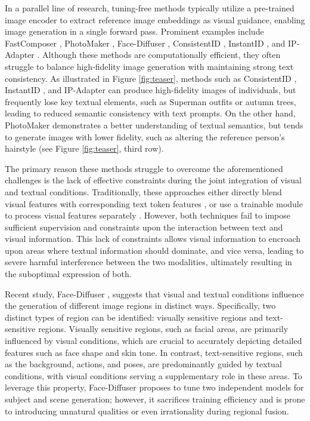 In a parallel line of research, tuning-free methods typically utilize a pre-trained image encoder to extract reference image embeddings as visual guidance, enabling image generation in a single forward pass. Prominent examples include FastComposer \cite{xiao2023fastcomposer}, PhotoMaker \cite{li2024photomaker}, Face-Diffuser \cite{wang2024high}, ConsistentID \cite{huang2024consistentid}, InstantID \cite{wang2024instantid}, and IP-Adapter \cite{ye2023ip}. Although these methods are computationally efficient, they often struggle to balance high-fidelity image generation with maintaining strong text consistency. As illustrated in Figure \ref{fig:teaser}, methods such as ConsistentID \cite{huang2024consistentid}, InstantID \cite{wang2024instantid}, and IP-Adapter \cite{ye2023ip} can produce high-fidelity images of individuals, but frequently lose key textual elements, such as Superman outfits or autumn trees, leading to reduced semantic consistency with text prompts. On the other hand, PhotoMaker \cite{li2024photomaker} demonstrates a better understanding of textual semantics, but tends to generate images with lower fidelity, such as altering the reference person's hairstyle (see Figure \ref{fig:teaser}, third row).

The primary reason these methods struggle to overcome the aforementioned challenges is the lack of effective constraints during the joint integration of visual and textual conditions. Traditionally, these approaches either directly blend visual features with corresponding text token features \cite{xiao2023fastcomposer,li2024photomaker}, or use a trainable module to process visual features separately \cite{ye2023ip,huang2024consistentid}. However, both techniques fail to impose sufficient supervision and constraints upon the interaction between text and visual information. This lack of constraints allows visual information to encroach upon areas where textual information should dominate, and vice versa, leading to severe harmful interference between the two modalities, ultimately resulting in the suboptimal expression of both.

Recent study, Face-Diffuser \cite{wang2024high}, suggests that visual and textual conditions influence the generation of different image regions in distinct ways. Specifically, two distinct types of region can be identified: visually sensitive regions and text-sensitive regions. Visually sensitive regions, such as facial areas, are primarily influenced by visual conditions, which are crucial to accurately depicting detailed features such as face shape and skin tone. In contrast, text-sensitive regions, such as the background, actions, and poses, are predominantly guided by textual conditions, with visual conditions serving a supplementary role in these areas.  To leverage this property, Face-Diffuser \cite{wang2024high} proposes to tune two independent models for subject and scene generation; however, it sacrifices training efficiency and is prone to introducing unnatural qualities or even irrationality during regional fusion.

